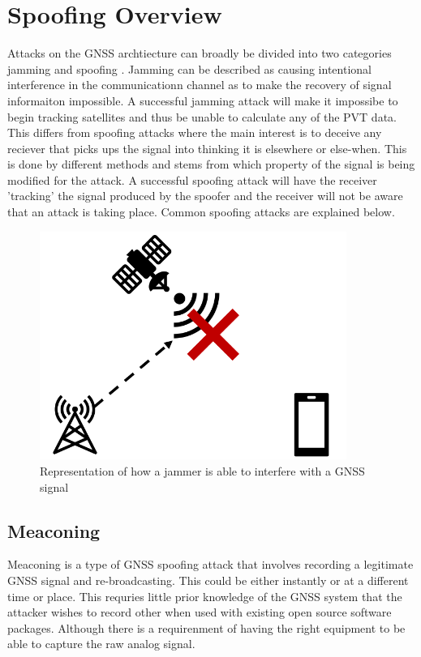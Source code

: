 
\section{Spoofing Overview}
Attacks on the GNSS archtiecture can broadly be divided into two categories jamming and spoofing \cite{RN33} \cite{RN32}. Jamming can be described as causing intentional
interference in the communicationn channel as to make the recovery of signal informaiton impossible. A successful jamming attack will make it impossibe to begin tracking
satellites and thus be unable to calculate any of the PVT data. This differs from spoofing attacks where the main interest is to deceive any reciever that picks ups the
signal into thinking it is elsewhere or else-when. This is done by different methods and stems from which property of the signal is being modified for the attack. A
successful spoofing attack will have the receiver 'tracking' the signal produced by the spoofer and the receiver will not be aware that an attack is taking place. Common
spoofing attacks are explained below.

\begin{figure}[h]
    \begin{centering}
        \includegraphics[width=10cm, keepaspectratio]{Figures/Jamming.png}
        \caption{Representation of how a jammer is able to interfere with a GNSS signal}
    \label{fig:jamming cartoon}
    \end{centering}
\end{figure}

\subsection{Meaconing}
Meaconing is a type of GNSS spoofing attack that involves recording a legitimate GNSS signal and re-broadcasting. This could be either instantly or at a different time or
place. This requries little prior knowledge of the GNSS system that the attacker wishes to record other when used with existing open source software packages. Although
there is a requirenment of having the right equipment to be able to capture the raw analog signal.

